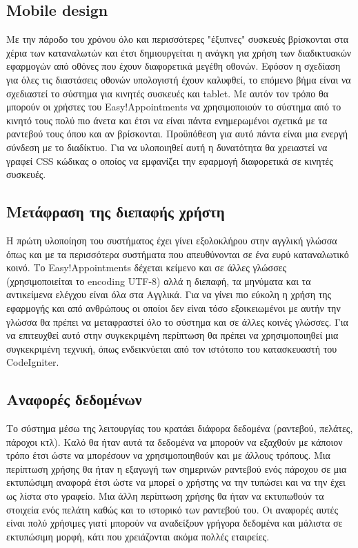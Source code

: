 \subsection{Mobile design}
Με την πάροδο του χρόνου όλο και περισσότερες "έξυπνες" συσκευές βρίσκονται στα χέρια των καταναλωτών και έτσι δημιουργείται η ανάγκη για χρήση των διαδικτυακών εφαρμογών από οθόνες που έχουν διαφορετικά μεγέθη οθονών. Εφόσον η σχεδίαση για όλες τις διαστάσεις οθονών υπολογιστή έχουν καλυφθεί, το επόμενο βήμα είναι να σχεδιαστεί το σύστημα για κινητές συσκευές και tablet. Με αυτόν τον τρόπο θα μπορούν οι χρήστες του Easy!Appointments να χρησιμοποιούν το σύστημα από το κινητό τους πολύ πιο άνετα και έτσι να είναι πάντα ενημερωμένοι σχετικά με τα ραντεβού τους όπου και αν βρίσκονται. Προϋπόθεση για αυτό πάντα είναι μια ενεργή σύνδεση με το διαδίκτυο. Για να υλοποιηθεί αυτή η δυνατότητα θα χρειαστεί να γραφεί CSS κώδικας ο οποίος να εμφανίζει την εφαρμογή διαφορετικά σε κινητές συσκευές.

\subsection{Μετάφραση της διεπαφής χρήστη}
Η πρώτη υλοποίηση του συστήματος έχει γίνει εξολοκλήρου στην αγγλική γλώσσα όπως και με τα περισσότερα συστήματα που απευθύνονται σε ένα ευρύ καταναλωτικό κοινό. Το Easy!Appointments δέχεται κείμενο και σε άλλες γλώσσες (χρησιμοποιείται το encoding UTF-8) αλλά η διεπαφή, τα μηνύματα και τα αντικείμενα ελέγχου είναι όλα στα Αγγλικά. Για να γίνει πιο εύκολη η χρήση της εφαρμογής και από ανθρώπους οι οποίοι δεν είναι τόσο εξοικειωμένοι με αυτήν την γλώσσα θα πρέπει να μεταφραστεί όλο το σύστημα και σε άλλες κοινές γλώσσες. Για να επιτευχθεί αυτό στην συγκεκριμένη περίπτωση θα πρέπει να χρησιμοποιηθεί μια συγκεκριμένη τεχνική, όπως ενδεικνύεται από τον ιστότοπο του κατασκευαστή του CodeIgniter.

\subsection{Αναφορές δεδομένων}
Το σύστημα μέσω της λειτουργίας του κρατάει διάφορα δεδομένα (ραντεβού, πελάτες, πάροχοι κτλ). Καλό θα ήταν αυτά τα δεδομένα να μπορούν να εξαχθούν με κάποιον τρόπο έτσι ώστε να μπορέσουν να χρησιμοποιηθούν και με άλλους τρόπους. Μια περίπτωση χρήσης θα ήταν η εξαγωγή των σημερινών ραντεβού ενός πάροχου σε μια εκτυπώσιμη αναφορά έτσι ώστε να μπορεί ο χρήστης να την τυπώσει και να την έχει ως λίστα στο γραφείο. Μια άλλη περίπτωση χρήσης θα ήταν να εκτυπωθούν τα στοιχεία ενός πελάτη καθώς και το ιστορικό των ραντεβού του. Οι αναφορές αυτές είναι πολύ χρήσιμες γιατί μπορούν να αναδείξουν γρήγορα δεδομένα και μάλιστα σε εκτυπώσιμη μορφή, κάτι που χρειάζονται ακόμα πολλές εταιρείες.

